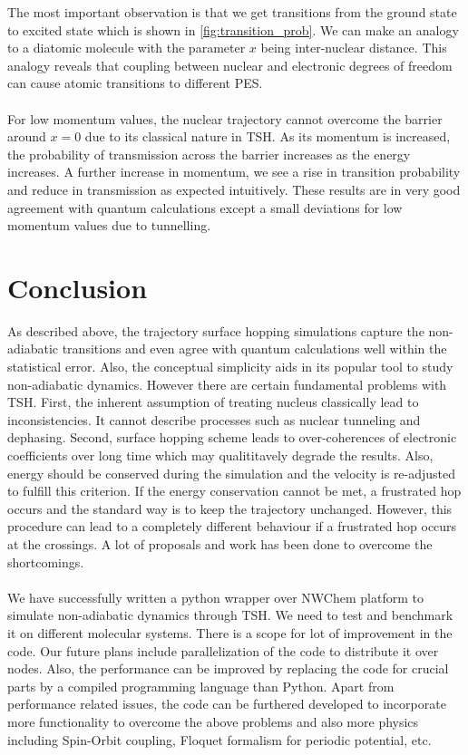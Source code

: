 The most important observation is that we get transitions from the ground state to excited state which is shown in \ref{fig:transition_prob}. We can make an analogy to a diatomic molecule with the parameter $x$ being inter-nuclear distance. This analogy reveals that coupling between nuclear and electronic degrees of freedom can cause atomic transitions to different PES. \\ \\ For low momentum values, the nuclear trajectory cannot overcome the barrier around $x=0$ due to its classical nature in TSH. As its momentum is increased, the probability of transmission across the barrier increases as the energy increases. A further increase in momentum, we see a rise in transition probability and reduce in transmission as expected intuitively. These results are in very good agreement with quantum calculations except a small deviations for low momentum values due to tunnelling.

\section{Conclusion}

As described above, the trajectory surface hopping simulations capture the non-adiabatic transitions and even agree with quantum calculations well within the statistical error. Also, the conceptual simplicity aids in its popular tool to study non-adiabatic dynamics. However there are certain fundamental problems with TSH. First, the inherent assumption of treating nucleus classically lead to inconsistencies. It cannot describe processes such as nuclear tunneling and dephasing.\cite{curchod,dephasing_1,dephasing_2} Second, surface hopping scheme leads to over-coherences of electronic coefficients over long time which may qualititavely degrade the results.\cite{coherences,wang_TSH} Also, energy should be conserved during the simulation and the velocity is re-adjusted to fulfill this criterion. If the energy conservation cannot be met, a frustrated hop occurs and the standard way is to keep the trajectory unchanged. However, this procedure can lead to a completely different behaviour if a frustrated hop occurs at the crossings. A lot of proposals and work has been done to overcome the shortcomings.\cite{TSH_review,dephasing_2,gen_tsh,quantum_tsh} \\ \\ 
We have successfully written a python wrapper over NWChem platform to simulate non-adiabatic dynamics through TSH. We need to test and benchmark it on different molecular systems. There is a scope for lot of improvement in the code. Our future plans include parallelization of the code to distribute it over nodes. Also, the performance can be improved by replacing the code for crucial parts by a compiled programming language than Python. Apart from performance related issues, the code can be furthered developed to incorporate more functionality to overcome the above problems and also more physics including Spin-Orbit coupling, Floquet formalism for periodic potential, etc.\cite{TSH_review}